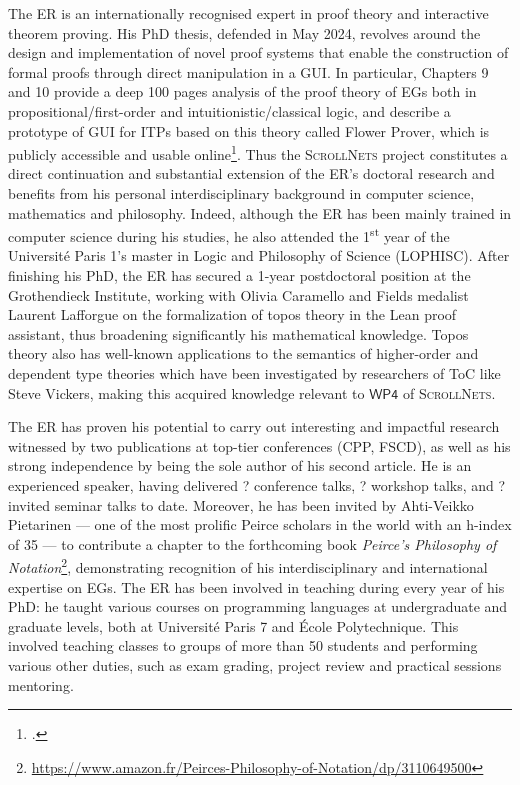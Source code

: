 \documentclass[12pt,draftproposal]{msca-pf}
\newcommand{\proj}{\small\textsc{ScrollNets}}
\newcommand{\WP}[1]{$\mathsf{WP#1}$}
\begin{document}
The ER is an internationally recognised expert in proof theory and interactive theorem proving. His
PhD thesis, defended in May 2024, revolves around the design and implementation of novel proof
systems that enable the construction of formal proofs through direct manipulation in a GUI. In
particular, Chapters 9 and 10 provide a deep 100 pages analysis of the proof theory of EGs both in
propositional/first-order and intuitionistic/classical logic, and describe a prototype of GUI for
ITPs based on this theory called Flower Prover, which is publicly accessible and usable
online\footcite{flower-prover}. Thus the {\proj} project constitutes a direct continuation and
substantial extension of the ER's doctoral research and benefits from his personal interdisciplinary
background in computer science, mathematics and philosophy. Indeed, although the ER has been mainly
trained in computer science during his studies, he also attended the 1\textsuperscript{st} year of
the Université Paris 1's master in Logic and Philosophy of Science (LOPHISC). After finishing his
PhD, the ER has secured a 1-year postdoctoral position at the Grothendieck Institute, working with
Olivia Caramello and Fields medalist Laurent Lafforgue on the formalization of topos theory in the
Lean proof assistant, thus broadening significantly his mathematical knowledge. Topos theory also
has well-known applications to the semantics of higher-order and dependent type theories which have
been investigated by researchers of ToC like Steve Vickers, making this acquired knowledge relevant
to \WP{4} of {\proj}.

The ER has proven his potential to carry out interesting and impactful research witnessed by two
publications at top-tier conferences (CPP, FSCD), as well as his strong independence by being the
sole author of his second article. He is an experienced speaker, having delivered ? conference
talks, ? workshop talks, and ? invited seminar talks to date. Moreover, he has been invited by
Ahti-Veikko Pietarinen --- one of the most prolific Peirce scholars in the world with an h-index of
35 --- to contribute a chapter to the forthcoming book \textit{Peirce’s Philosophy of
Notation}\footnote{\url{https://www.amazon.fr/Peirces-Philosophy-of-Notation/dp/3110649500}},
demonstrating recognition of his interdisciplinary and international expertise on EGs.
The ER has been involved in teaching during every year of his PhD: he taught various courses on
programming languages at undergraduate and graduate levels, both at Université Paris 7 and École
Polytechnique. This involved teaching classes to groups of more than 50 students and performing
various other duties, such as exam grading, project review and practical sessions mentoring.
\end{document}
